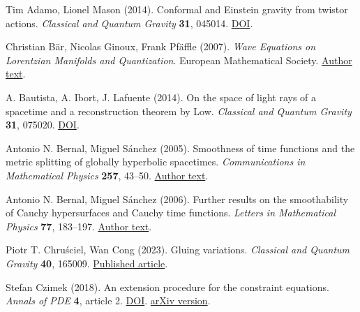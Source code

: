 \documentclass[
  english,
  11pt,
  reqno]{amsart}
\begin{document}
\begingroup
\makeatletter
\let\@bibtitlestyle\relax
\def\bibliofont{\normalsize}
\renewcommand{\@biblabel}[1]{}
\makeatother
\setlength{\labelsep}{0pt}
\begin{thebibliography}{}
\setlength{\emergencystretch}{5em}
\raggedright

\leavevmode{}\label{ref-AdamoMason2014}Tim Adamo, Lionel Mason (2014). Conformal and Einstein gravity from
twistor actions. \emph{Classical and Quantum Gravity} \textbf{31},
045014. \href{https://doi.org/10.1088/0264-9381/31/4/045014}{DOI}.

\leavevmode{}\label{ref-BarGinouxPfaffle2007}Christian Bär, Nicolas Ginoux, Frank Pfäffle (2007). \emph{Wave
Equations on Lorentzian Manifolds and Quantization}. European
Mathematical Society. \href{https://arxiv.org/pdf/0806.1036}{Author
text}.

\leavevmode{}\label{ref-BautistaIbortLafuente2014}A. Bautista, A. Ibort, J. Lafuente (2014). On the space of light rays of
a spacetime and a reconstruction theorem by Low. \emph{Classical and
Quantum Gravity} \textbf{31}, 075020.
\href{https://doi.org/10.1088/0264-9381/31/7/075020}{DOI}.

\leavevmode{}\label{ref-BernalSanchez2005}Antonio N. Bernal, Miguel Sánchez (2005). Smoothness of time functions
and the metric splitting of globally hyperbolic spacetimes.
\emph{Communications in Mathematical Physics} \textbf{257}, 43--50.
\href{https://arxiv.org/pdf/gr-qc/0401112}{Author text}.

\leavevmode{}\label{ref-BernalSanchez2006}Antonio N. Bernal, Miguel Sánchez (2006). Further results on the
smoothability of Cauchy hypersurfaces and Cauchy time functions.
\emph{Letters in Mathematical Physics} \textbf{77}, 183--197.
\href{https://arxiv.org/pdf/gr-qc/0512095}{Author text}.

\leavevmode{}\label{ref-ChruscielCong2023}Piotr T. Chruściel, Wan Cong (2023). Gluing variations. \emph{Classical
and Quantum Gravity} \textbf{40}, 165009.
\href{https://doi.org/10.1088/1361-6382/ace494}{Published article}.

\leavevmode{}\label{ref-Czimek2018}Stefan Czimek (2018). An extension procedure for the constraint
equations. \emph{Annals of PDE} \textbf{4}, article 2.
\href{https://doi.org/10.1007/s40818-017-0039-3}{DOI}.
\href{https://arxiv.org/abs/1609.08814v2}{arXiv version}.


\end{thebibliography}
\end{document}
